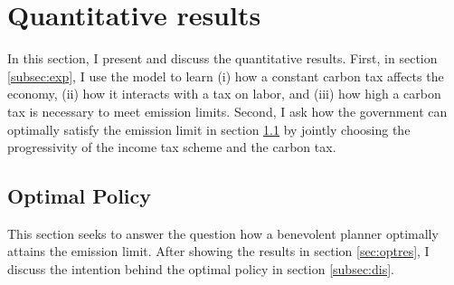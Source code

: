 \section{Quantitative results}\label{sec:res}

In this section, I present and discuss the quantitative results. 
First, in section \ref{subsec:exp}, I use the model to learn (i) how a constant carbon tax affects the economy, (ii) how it interacts with a tax on labor, and (iii) how high a carbon tax is necessary to meet emission limits.
Second, I ask how the government can optimally satisfy the emission limit in section \ref{subsec:mr} by jointly choosing the progressivity of the income tax scheme and the carbon tax. 




\subsection{Optimal Policy}\label{subsec:mr}


This section seeks to answer the question how a benevolent planner optimally attains the emission limit. After showing the results in section \ref{sec:optres}, I discuss the intention behind the optimal policy in section \ref{subsec:dis}. 

